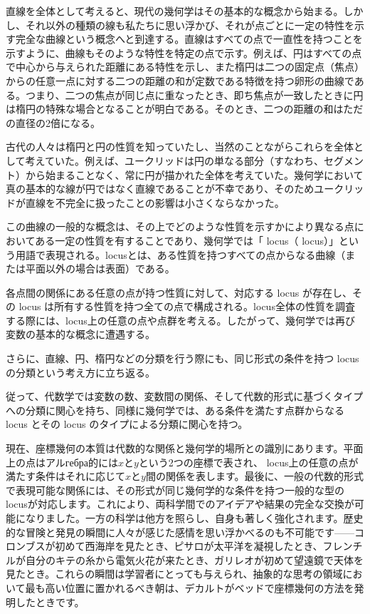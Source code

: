 \documentclass[a4paper,11pt,openany]{ltjsbook}
\begin{document}
直線を全体として考えると、現代の幾何学はその基本的な概念から始まる。しかし、それ以外の種類の線も私たちに思い浮かび、それが点ごとに一定の特性を示す完全な曲線という概念へと到達する。直線はすべての点で一直性を持つことを示すように、曲線もそのような特性を特定の点で示す。例えば、円はすべての点で中心から与えられた距離にある特性を示し、また楕円は二つの固定点（焦点）からの任意一点に対する二つの距離の和が定数である特徴を持つ卵形の曲線である。つまり、二つの焦点が同じ点に重なったとき、即ち焦点が一致したときに円は楕円の特殊な場合となることが明白である。そのとき、二つの距離の和はただの直径の2倍になる。

古代の人々は楕円と円の性質を知っていたし、当然のことながらこれらを全体として考えていた。例えば、ユークリッドは円の単なる部分（すなわち、セグメント）から始まることなく、常に円が描かれた全体を考えていた。幾何学において真の基本的な線が円ではなく直線であることが不幸であり、そのためユークリッドが直線を不完全に扱ったことの影響は小さくならなかった。

この曲線の一般的な概念は、その上でどのような性質を示すかにより異なる点においてある一定の性質を有することであり、幾何学では「 locus（ locus）」という用語で表現される。locusとは、ある性質を持つすべての点からなる曲線（または平面以外の場合は表面）である。

各点間の関係にある任意の点が持つ性質に対して、対応する locus が存在し、その locus は所有する性質を持つ全ての点で構成される。locus全体の性質を調査する際には、locus上の任意の点や点群を考える。したがって、幾何学では再び変数の基本的な概念に遭遇する。

さらに、直線、円、楕円などの分類を行う際にも、同じ形式の条件を持つ locus の分類という考え方に立ち返る。

従って、代数学では変数の数、変数間の関係、そして代数的形式に基づくタイプへの分類に関心を持ち、同様に幾何学では、ある条件を満たす点群からなる locus とその locus のタイプによる分類に関心を持つ。

現在、座標幾何の本質は代数的な関係と幾何学的場所との識別にあります。平面上の点はアルгебра的には$x$と$y$という2つの座標で表され、 locus上の任意の点が満たす条件はそれに応じて$x$と$y$間の関係を表します。最後に、一般の代数的形式で表現可能な関係には、その形式が同じ幾何学的な条件を持つ一般的な型のlocusが対応します。これにより、両科学間でのアイデアや結果の完全な交換が可能になりました。一方の科学は他方を照らし、自身も著しく強化されます。歴史的な冒険と発見の瞬間に人々が感じた感情を思い浮かべるのも不可能です——コロンブスが初めて西海岸を見たとき、ピサロが太平洋を凝視したとき、フレンチルが自分のキテの糸から電気火花が来たとき、ガリレオが初めて望遠鏡で天体を見たとき。これらの瞬間は学習者にとっても与えられ、抽象的な思考の領域において最も高い位置に置かれるべき朝は、デカルトがベッドで座標幾何の方法を発明したときです。
\end{document}
